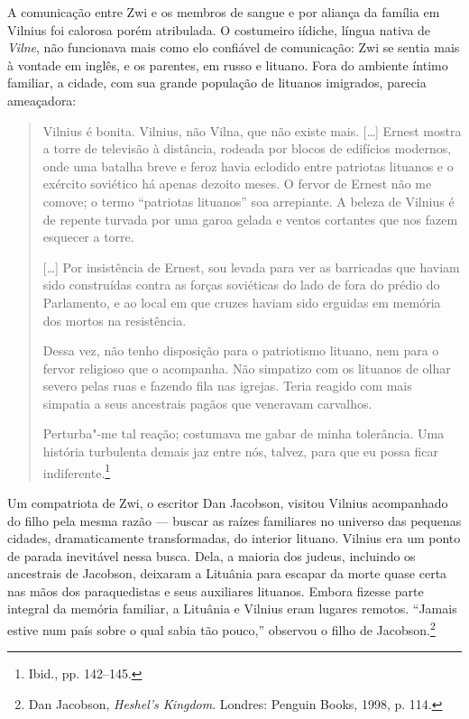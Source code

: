 A comunicação entre Zwi e os membros de sangue e por aliança da família
em Vilnius foi calorosa porém atribulada. O costumeiro iídiche, língua
nativa de \textit{Vilne}, não funcionava mais como elo confiável de comunicação:
Zwi se sentia mais à vontade em inglês, e os parentes, em russo e
lituano. Fora do ambiente íntimo familiar, a cidade, com sua grande
população de lituanos imigrados, parecia ameaçadora:

\begin{quote}
Vilnius é bonita. Vilnius, não Vilna, que não existe mais.
[\ldots{}] Ernest mostra a torre de televisão à distância, rodeada por
blocos de edifícios modernos, onde uma batalha breve e feroz havia
eclodido entre patriotas lituanos e o exército soviético há apenas
dezoito meses. O fervor de Ernest não me comove; o termo ``patriotas
lituanos'' soa arrepiante. A beleza de Vilnius é de repente turvada por
uma garoa gelada e ventos cortantes que nos fazem esquecer a torre.

[\ldots{}] Por insistência de Ernest, sou levada para ver as barricadas
que haviam sido construídas contra as forças soviéticas do lado de fora
do prédio do Parlamento, e ao local em que cruzes haviam sido erguidas
em memória dos mortos na resistência.

Dessa vez, não tenho disposição para o patriotismo lituano, nem para o
fervor religioso que o acompanha. Não simpatizo com os lituanos de olhar
severo pelas ruas e fazendo fila nas igrejas. Teria reagido com mais
simpatia a seus ancestrais pagãos que veneravam carvalhos.

Perturba"-me tal reação; costumava me gabar de minha tolerância. Uma
história turbulenta demais jaz entre nós, talvez, para que eu possa
ficar indiferente.\footnote{Ibid., pp. 142--145.}
\end{quote}

Um compatriota de Zwi, o escritor Dan Jacobson, visitou Vilnius
acompanhado do filho pela mesma razão --- buscar as raízes familiares no
universo das pequenas cidades, dramaticamente transformadas, do interior
lituano. Vilnius era um ponto de parada inevitável nessa busca. Dela, a
maioria dos judeus, incluindo os ancestrais de Jacobson, deixaram a
Lituânia para escapar da morte quase certa nas mãos dos paraquedistas
 e seus auxiliares lituanos. Embora fizesse parte integral da memória
familiar, a Lituânia e Vilnius eram lugares remotos. ``Jamais estive num
país sobre o qual sabia tão pouco,'' observou o filho de
Jacobson.\footnote{Dan Jacobson, \textit{Heshel's Kingdom}. Londres: Penguin Books, 1998, p. 114.}

